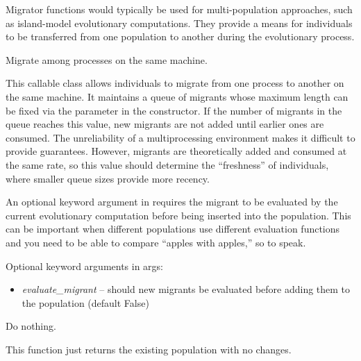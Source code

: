\documentclass[letterpaper,10pt,english]{sphinxmanual}
\begin{document}
Migrator functions would typically be used for multi-population approaches,
such as island-model evolutionary computations. They provide a means for
individuals to be transferred from one population to another during the
evolutionary process.
\label{reference:module-migrators}

\begin{fulllineitems}
\label{reference:inspyred.ec.migrators.MultiprocessingMigrator}
Migrate among processes on the same machine.

This callable class allows individuals to migrate from one process 
to another on the same machine. It maintains a queue of migrants
whose maximum length can be fixed via the 
parameter in the constructor. If the number of migrants in the queue
reaches this value, new migrants are not added until earlier ones
are consumed. The unreliability of a multiprocessing environment
makes it difficult to provide guarantees. However, migrants are 
theoretically added and consumed at the same rate, so this value
should determine the ``freshness'' of individuals, where smaller
queue sizes provide more recency.

An optional keyword argument in  requires the migrant to be
evaluated by the current evolutionary computation before being inserted 
into the population. This can be important when different populations 
use different evaluation functions and you need to be able to compare 
``apples with apples,'' so to speak.

Optional keyword arguments in args:
\begin{itemize}
\item {} 
\emph{evaluate\_migrant} -- should new migrants be evaluated before 
adding them to the population (default False)

\end{itemize}

\end{fulllineitems}


\begin{fulllineitems}
\label{reference:inspyred.ec.migrators.default_migration}
Do nothing.

This function just returns the existing population with no changes.

\end{fulllineitems}
\end{document}
